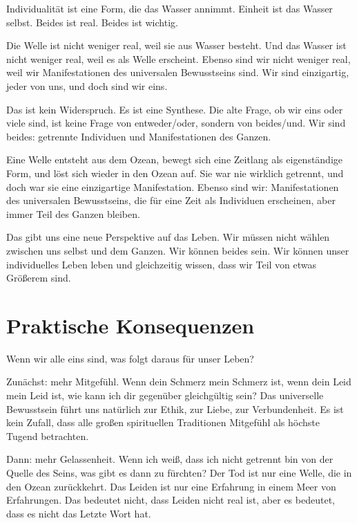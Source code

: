 Individualität ist eine Form, die das Wasser annimmt. Einheit ist das Wasser selbst. Beides ist real. Beides ist wichtig.

Die Welle ist nicht weniger real, weil sie aus Wasser besteht. Und das Wasser ist nicht weniger real, weil es als Welle erscheint. Ebenso sind wir nicht weniger real, weil wir Manifestationen des universalen Bewusstseins sind. Wir sind einzigartig, jeder von uns, und doch sind wir eins.

Das ist kein Widerspruch. Es ist eine Synthese. Die alte Frage, ob wir \glqq eins\grqq{} oder \glqq viele\grqq{} sind, ist keine Frage von \glqq entweder/oder\grqq{}, sondern von \glqq beides/und\grqq{}. Wir sind beides: getrennte Individuen und Manifestationen des Ganzen.

\begin{bsp}
	Eine Welle entsteht aus dem Ozean, bewegt sich eine Zeitlang als eigenständige Form, und löst sich wieder in den Ozean auf. Sie war nie wirklich \glqq getrennt\grqq{}, und doch war sie eine einzigartige Manifestation. Ebenso sind wir: Manifestationen des universalen Bewusstseins, die für eine Zeit als Individuen erscheinen, aber immer Teil des Ganzen bleiben.
\end{bsp}

Das gibt uns eine neue Perspektive auf das Leben. Wir müssen nicht wählen zwischen \glqq uns selbst\grqq{} und \glqq dem Ganzen\grqq{}. Wir können beides sein. Wir können unser individuelles Leben leben und gleichzeitig wissen, dass wir Teil von etwas Größerem sind.

\section{Praktische Konsequenzen}

Wenn wir alle eins sind, was folgt daraus für unser Leben?

Zunächst: mehr Mitgefühl. Wenn dein Schmerz mein Schmerz ist, wenn dein Leid mein Leid ist, wie kann ich dir gegenüber gleichgültig sein? Das universelle Bewusstsein führt uns natürlich zur Ethik, zur Liebe, zur Verbundenheit. Es ist kein Zufall, dass alle großen spirituellen Traditionen Mitgefühl als höchste Tugend betrachten.

Dann: mehr Gelassenheit. Wenn ich weiß, dass ich nicht getrennt bin von der Quelle des Seins, was gibt es dann zu fürchten? Der Tod ist nur eine Welle, die in den Ozean zurückkehrt. Das Leiden ist nur eine Erfahrung in einem Meer von Erfahrungen. Das bedeutet nicht, dass Leiden nicht real ist, aber es bedeutet, dass es nicht das Letzte Wort hat.

